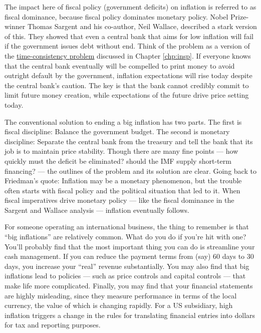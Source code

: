 The impact here of fiscal policy (government deficits) on inflation
is referred to as fiscal dominance, because fiscal policy dominates monetary policy.
Nobel Prize-winner Thomas Sargent  and his co-author, Neil Wallace,
described a stark version of this.
They showed that even a central bank that aims for low inflation will fail
if the government issues debt without end.
Think of the problem as
a version of the \hyperref[sec:time_cons]{time-consistency problem}
discussed in Chapter \ref{chp:insp}.
If everyone knows that the central bank eventually will be compelled to print money
to avoid outright default by the government, inflation expectations
 will rise today despite the central bank's  caution. The key is
 that the bank cannot credibly commit to limit future money creation, while
 expectations of the future drive price setting today.

The conventional solution to ending a big inflation has two parts.  The
first is fiscal discipline: Balance the government budget.  The
second is monetary discipline: Separate the central bank
from the treasury and tell the bank that its job is to maintain
price stability. Though there are many fine points --- how quickly must
the deficit be eliminated?  should the IMF supply short-term
financing?  --- the outlines of the problem and its solution
are clear.
Going back to Friedman's quote: Inflation may be a monetary phenomenon,
but the trouble often starts with fiscal policy and the political situation that led to it.
When fiscal imperatives drive monetary policy ---
like the fiscal dominance in the Sargent and Wallace analysis ---
inflation eventually follows.

For someone operating an international business,
the thing to remember is that ``big inflations''
are relatively common.
What do you do if you're hit with one?
You'll probably find that the
most important thing you can do is streamline your cash management.
If you can reduce the payment
terms from (say) 60 days to 30 days, you increase your ``real'' revenue substantially.
You may also find that big inflations lead to policies --- such as price controls and capital controls   --- that make life more complicated.
Finally, you may find that your financial statements
are highly misleading, since they measure performance in terms of the local
currency, the value of which is changing rapidly.
For a US subsidiary, high inflation triggers a change
in the rules for translating financial entries into dollars for tax and reporting purposes.

